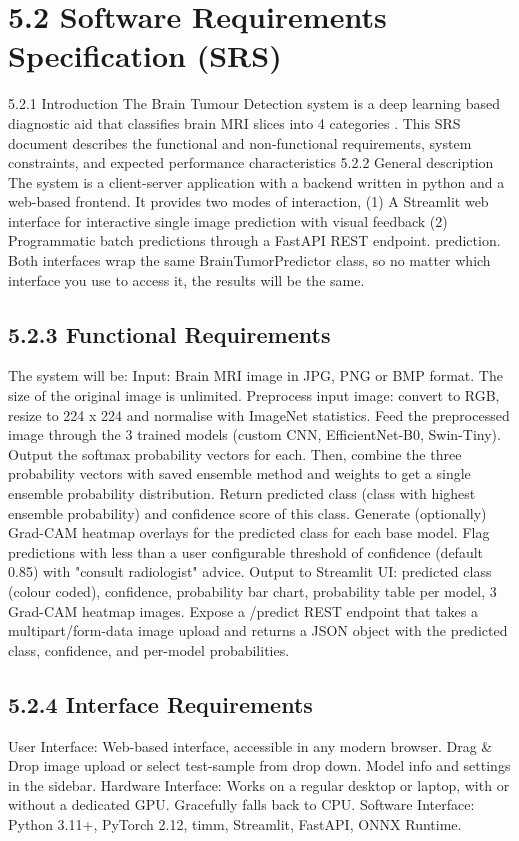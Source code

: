 \documentclass[12pt,a4paper,oneside]{report}
\begin{document}
\section*{5.2 Software Requirements Specification (SRS)}
5.2.1 Introduction
The Brain Tumour Detection system is a deep learning based diagnostic aid that classifies brain MRI slices into 4 categories . This SRS document describes the functional and non-functional requirements, system constraints, and expected performance characteristics
5.2.2 General description
The system is a client-server application with a backend written in python and a web-based frontend. It provides two modes of interaction, 
(1) A Streamlit web interface for interactive single image prediction with visual feedback 
(2) Programmatic batch predictions through a FastAPI REST endpoint. prediction. Both interfaces wrap the same BrainTumorPredictor class, so no matter which interface you use to access it, the results will be the same.
\subsection*{5.2.3 Functional Requirements}
The system will be:
Input: Brain MRI image in JPG, PNG or BMP format. The size of the original image is unlimited.
Preprocess input image: convert to RGB, resize to 224 x 224 and normalise with ImageNet statistics.
Feed the preprocessed image through the 3 trained models (custom CNN, EfficientNet-B0, Swin-Tiny). Output the softmax probability vectors for each.
Then, combine the three probability vectors with saved ensemble method and weights to get a single ensemble probability distribution.
Return predicted class (class with highest ensemble probability) and confidence score of this class.
Generate (optionally) Grad-CAM heatmap overlays for the predicted class for each base model.
Flag predictions with less than a user configurable threshold of confidence (default 0.85) with "consult radiologist" advice.
Output to Streamlit UI: predicted class (colour coded), confidence, probability bar chart, probability table per model, 3 Grad-CAM heatmap images. Expose a /predict REST endpoint that takes a multipart/form-data image upload and returns a JSON object with the predicted class, confidence, and per-model probabilities.
\subsection*{5.2.4 Interface Requirements}
User Interface:
Web-based interface, accessible in any modern browser.
Drag \& Drop image upload or select test-sample from drop down.
Model info and settings in the sidebar.
Hardware Interface:
Works on a regular desktop or laptop, with or without a dedicated GPU. Gracefully falls back to CPU.
Software Interface:
Python 3.11+, PyTorch 2.12, timm, Streamlit, FastAPI, ONNX Runtime.
\end{document}
